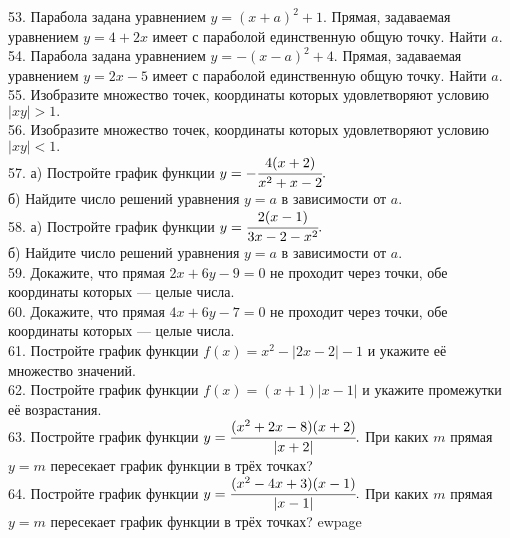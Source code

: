 53. Парабола задана уравнением $y=(x+a)^2+1.$ Прямая, задаваемая уравнением $y=4+2x$ имеет с параболой единственную общую точку. Найти $a.$\\
54. Парабола задана уравнением $y=-(x-a)^2+4.$ Прямая, задаваемая уравнением $y=2x-5$ имеет с параболой единственную общую точку. Найти $a.$\\
55. Изобразите множество точек, координаты которых удовлетворяют условию $|xy|>1.$\\
56. Изобразите множество точек, координаты которых удовлетворяют условию $|xy|<1.$\\
57. а) Постройте график функции $y=-\cfrac{4(x+2)}{x^2+x-2}.$\\
б) Найдите число решений уравнения $y=a$ в зависимости от $a.$\\
58. а) Постройте график функции $y=\cfrac{2(x-1)}{3x-2-x^2}.$\\
б) Найдите число решений уравнения $y=a$ в зависимости от $a.$\\
59. Докажите, что прямая $2x+6y-9=0$ не проходит через точки, обе координаты которых --- целые числа.\\
60. Докажите, что прямая $4x+6y-7=0$ не проходит через точки, обе координаты которых --- целые числа.\\
61. Постройте график функции $f(x)=x^2-|2x-2|-1$ и укажите её множество значений.\\
62. Постройте график функции $f(x)=(x+1)|x-1|$ и укажите промежутки её возрастания.\\
63. Постройте график функции $y=\cfrac{(x^2+2x-8)(x+2)}{|x+2|}.$ При каких $m$ прямая $y=m$ пересекает график функции в трёх точках?\\
64. Постройте график функции $y=\cfrac{(x^2-4x+3)(x-1)}{|x-1|}.$ При каких $m$ прямая $y=m$ пересекает график функции в трёх точках?
ewpage


